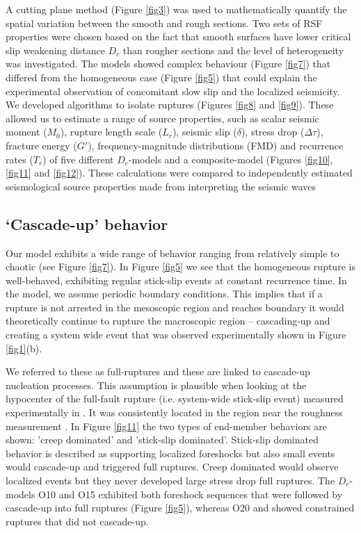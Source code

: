 \documentclass[preprint,1p, 10pt,authoryear]{elsarticle}
\begin{document}
A cutting plane method (Figure \ref{fig3}) was used to mathematically quantify the spatial variation between the smooth and rough sections. Two sets of RSF properties were chosen based on the fact that smooth surfaces have lower critical slip weakening distance $D_{c}$ than rougher sections and the level of heterogeneity was investigated. The models showed complex behaviour (Figure \ref{fig7}) that differed from the homogeneous case (Figure \ref{fig5}) that could explain the experimental observation of concomitant slow slip and the localized seismicity.  We developed algorithms to isolate ruptures (Figures \ref{fig8} and \ref{fig9}).  These allowed us to estimate a range of source properties, such as scalar seismic moment ($M_{0}$), rupture length scale ($L_{r}$), seismic slip ($\delta$), stress drop ($\Delta\tau$), fracture energy ($G'$), frequency-magnitude distributions (FMD) and recurrence rates ($T_{r}$) of five different $D_{c}$-models and a composite-model (Figures \ref{fig10}, \ref{fig11} and \ref{fig12}). These calculations were compared to independently estimated seismological source properties made from interpreting the seismic waves \citep{Selvadurai2019}

\subsection{`Cascade-up' behavior}
\label{Cascade_UP}
Our model exhibits a wide range of behavior ranging from relatively simple to chaotic (see Figure \ref{fig7}). In Figure \ref{fig5} we see that the homogeneous rupture is well-behaved, exhibiting regular stick-slip events at constant recurrence time.  In the model, we assume periodic boundary conditions. This implies that if a rupture is not arrested in the mesoscopic region and reaches boundary it would theoretically continue to rupture the macroscopic region -- cascading-up and creating a system wide event that was observed experimentally shown in Figure \ref{fig1}(b). 

We referred to these as full-ruptures and these are linked to cascade-up nucleation processes. This assumption is plausible when looking at the hypocenter of the full-fault rupture (i.e. system-wide stick-slip event) measured experimentally in \citet{Selvadurai2015}. It was consistently located in the region near the roughness measurement \citep[magenta star in fig. 7 and 8 in ][]{Selvadurai2015}. In Figure \ref{fig11} the two types of end-member behaviors are shown: 'creep dominated' and 'stick-slip dominated'. Stick-slip dominated behavior is described as supporting localized foreshocks but also small events would cascade-up and triggered full ruptures. Creep dominated would observe localized events but they never developed large stress drop full ruptures. The $D_{c}$-models O10 and O15 exhibited both foreshock sequences that were followed by cascade-up into full ruptures (Figure \ref{fig5}), whereas O20 and showed constrained ruptures that did not cascade-up. 
\end{document}
